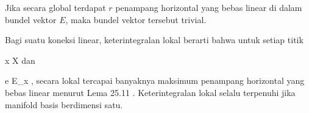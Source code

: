 Jika secara global
 {} {}
terdapat $r$ penampang horizontal yang bebas linear di dalam bundel vektor $E$, maka bundel vektor tersebut trivial.

Bagi suatu koneksi linear, keterintegralan lokal berarti bahwa untuk setiap titik

\mavergleichskette
{\vergleichskette
{ x
}
{ \in }{ X
}
{  }{
}
{    }{
}
{   }{
}
}
{}{}{}
dan

\mavergleichskette
{\vergleichskette
{ e
}
{ \in }{ E_x
}
{  }{
}
{    }{
}
{   }{
}
}
{}{}{,}
secara lokal
 {} {}
tercapai banyaknya maksimum penampang horizontal yang bebas linear menurut
Lema 25.11
 {} {.}
Keterintegralan lokal selalu terpenuhi jika manifold basis berdimensi satu.
